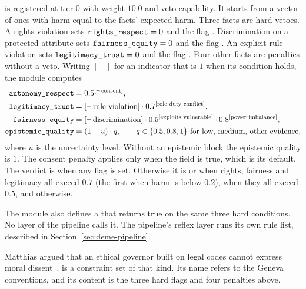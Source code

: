  is registered at tier 0 with weight $10.0$ and veto capability. It starts from
a vector of ones with harm equal to the facts' expected harm. Three facts are hard vetoes. A
rights violation sets $\texttt{rights\_respect}=0$ and the flag .
Discrimination on a protected attribute sets $\texttt{fairness\_equity}=0$ and the flag
. An explicit rule violation sets $\texttt{legitimacy\_trust}=0$ and the flag
. Four other facts are penalties without a veto. Writing $[\,\cdot\,]$ for
an indicator that is $1$ when its condition holds, the module computes
\begin{align}
\texttt{autonomy\_respect} &= 0.5^{[\neg\,\text{consent}]},\\
\texttt{legitimacy\_trust} &= [\neg\,\text{rule violation}]\cdot 0.7^{[\text{role duty conflict}]},\\
\texttt{fairness\_equity} &= [\neg\,\text{discrimination}]\cdot 0.5^{[\text{exploits vulnerable}]}\cdot 0.8^{[\text{power imbalance}]},\\
\texttt{epistemic\_quality} &= (1-u)\cdot q,\qquad q \in \{0.5, 0.8, 1\}\ \text{for low, medium, other evidence},
\end{align}
where $u$ is the uncertainty level. Without an epistemic block the epistemic quality is $1$. The
consent penalty applies only when the field
 is true, which is its default. The verdict is  when any flag
is set. Otherwise it is  or  when rights, fairness and
legitimacy all exceed $0.7$ (the first when harm is below $0.2$),  when they all
exceed $0.5$, and  otherwise.

The module also defines a  that returns true on the same three hard
conditions. No layer of the pipeline calls it. The pipeline's reflex layer runs its own rule
list, described in Section~\ref{sec:deme-pipeline}.

Matthias argued that an ethical governor built on legal codes cannot express moral
dissent~\cite{matthias2011governor}.  is a constraint set of that kind. Its name
refers to the Geneva conventions, and its content is the three hard flags and four penalties
above.

